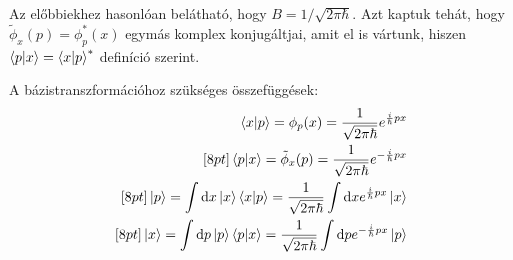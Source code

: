 \documentclass[12pt]{article}
\theoremstyle{plain}
\newcommand{\dd}{\mathrm{d}}
\begin{document}
Az előbbiekhez hasonlóan belátható, hogy $B=1/\sqrt{2\pi\hbar}$. Azt kaptuk tehát, hogy $\tilde\phi_x(p) = \phi^{*}_p(x)$ egymás komplex konjugáltjai,
amit el is vártunk, hiszen $\braket{p|x}=\braket{x|p}^{*}$ definíció szerint.

A bázistranszformációhoz szükséges összefüggések:
\begin{eqnarray}
    \braket{x|p} = \phi_p(x) = \frac{1}{\sqrt{2\pi\hbar}}e^{\frac{i}{\hbar}px} \\ [8pt]
    \braket{p|x} = \tilde\phi_x(p) = \frac{1}{\sqrt{2\pi\hbar}}e^{-\frac{i}{\hbar}px} \\ [8pt]
    \ket p = \int\dd x \ket x \braket{x|p} = \frac{1}{\sqrt{2\pi\hbar}} \int\dd x e^{\frac{i}{\hbar}px} \ket x \\ [8pt]
    \ket x = \int\dd p \ket p \braket{p|x} = \frac{1}{\sqrt{2\pi\hbar}} \int\dd p e^{-\frac{i}{\hbar}px} \ket p \\
\end{eqnarray}
\end{document}
